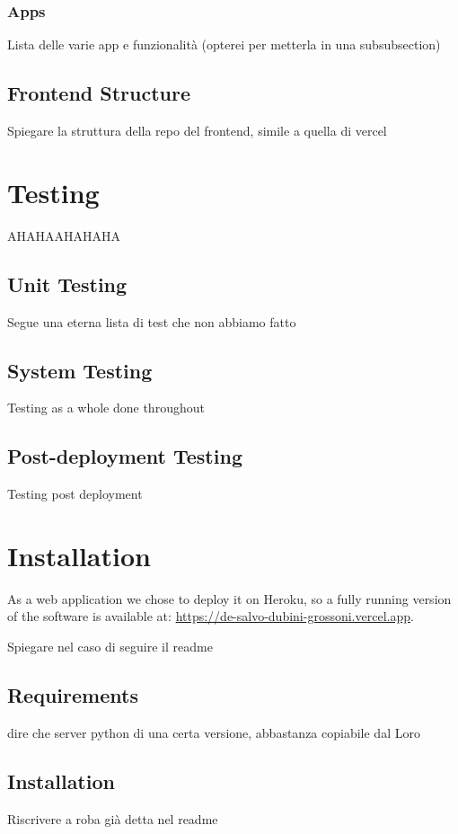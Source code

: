 \documentclass[table, 12pt]{article}
\begin{document}
\subsubsection{Apps}
Lista delle varie app e funzionalità (opterei per metterla in una subsubsection)

\subsection{Frontend Structure}
Spiegare la struttura della repo del frontend, simile a quella di vercel


\newpage
\section{Testing}
AHAHAAHAHAHA

\subsection{Unit Testing}
Segue una eterna lista di test che non abbiamo fatto

\subsection{System Testing}
Testing as a whole done throughout

\subsection{Post-deployment Testing}
Testing post deployment

\section{Installation}
As a web application we chose to deploy it on Heroku, so
a fully running version of the software is available at:\newline
\url{https://de-salvo-dubini-grossoni.vercel.app}.

Spiegare nel caso di seguire il readme 

\subsection{Requirements}
dire che server python di una certa versione, abbastanza copiabile dal Loro

\subsection{Installation}
Riscrivere a roba già detta nel readme
\end{document}

